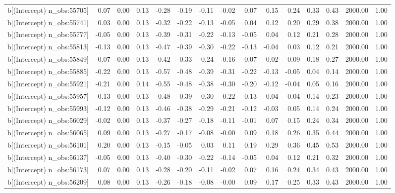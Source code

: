 \begin{table}[ht]
\begin{tabular}{rrrrrrrrrrrrrrr}
  b[(Intercept) n\_obs:55705] & 0.07 & 0.00 & 0.13 & -0.28 & -0.19 & -0.11 & -0.02 & 0.07 & 0.15 & 0.24 & 0.33 & 0.43 & 2000.00 & 1.00 \\ 
  b[(Intercept) n\_obs:55741] & 0.03 & 0.00 & 0.13 & -0.32 & -0.22 & -0.13 & -0.05 & 0.04 & 0.12 & 0.20 & 0.29 & 0.38 & 2000.00 & 1.00 \\ 
  b[(Intercept) n\_obs:55777] & -0.05 & 0.00 & 0.13 & -0.39 & -0.31 & -0.22 & -0.13 & -0.05 & 0.04 & 0.12 & 0.21 & 0.28 & 2000.00 & 1.00 \\ 
  b[(Intercept) n\_obs:55813] & -0.13 & 0.00 & 0.13 & -0.47 & -0.39 & -0.30 & -0.22 & -0.13 & -0.04 & 0.03 & 0.12 & 0.21 & 2000.00 & 1.00 \\ 
  b[(Intercept) n\_obs:55849] & -0.07 & 0.00 & 0.13 & -0.42 & -0.33 & -0.24 & -0.16 & -0.07 & 0.02 & 0.09 & 0.18 & 0.27 & 2000.00 & 1.00 \\ 
  b[(Intercept) n\_obs:55885] & -0.22 & 0.00 & 0.13 & -0.57 & -0.48 & -0.39 & -0.31 & -0.22 & -0.13 & -0.05 & 0.04 & 0.14 & 2000.00 & 1.00 \\ 
  b[(Intercept) n\_obs:55921] & -0.21 & 0.00 & 0.14 & -0.55 & -0.48 & -0.38 & -0.30 & -0.20 & -0.12 & -0.04 & 0.05 & 0.16 & 2000.00 & 1.00 \\ 
  b[(Intercept) n\_obs:55957] & -0.13 & 0.00 & 0.13 & -0.48 & -0.39 & -0.30 & -0.22 & -0.13 & -0.04 & 0.04 & 0.14 & 0.23 & 2000.00 & 1.00 \\ 
  b[(Intercept) n\_obs:55993] & -0.12 & 0.00 & 0.13 & -0.46 & -0.38 & -0.29 & -0.21 & -0.12 & -0.03 & 0.05 & 0.14 & 0.24 & 2000.00 & 1.00 \\ 
  b[(Intercept) n\_obs:56029] & -0.02 & 0.00 & 0.13 & -0.37 & -0.27 & -0.18 & -0.11 & -0.01 & 0.07 & 0.15 & 0.24 & 0.34 & 2000.00 & 1.00 \\ 
  b[(Intercept) n\_obs:56065] & 0.09 & 0.00 & 0.13 & -0.27 & -0.17 & -0.08 & -0.00 & 0.09 & 0.18 & 0.26 & 0.35 & 0.44 & 2000.00 & 1.00 \\ 
  b[(Intercept) n\_obs:56101] & 0.20 & 0.00 & 0.13 & -0.15 & -0.05 & 0.03 & 0.11 & 0.19 & 0.29 & 0.36 & 0.45 & 0.53 & 2000.00 & 1.00 \\ 
  b[(Intercept) n\_obs:56137] & -0.05 & 0.00 & 0.13 & -0.40 & -0.30 & -0.22 & -0.14 & -0.05 & 0.04 & 0.12 & 0.21 & 0.32 & 2000.00 & 1.00 \\ 
  b[(Intercept) n\_obs:56173] & 0.07 & 0.00 & 0.13 & -0.28 & -0.20 & -0.11 & -0.02 & 0.07 & 0.16 & 0.24 & 0.34 & 0.43 & 2000.00 & 1.00 \\ 
  b[(Intercept) n\_obs:56209] & 0.08 & 0.00 & 0.13 & -0.26 & -0.18 & -0.08 & -0.00 & 0.09 & 0.17 & 0.25 & 0.33 & 0.43 & 2000.00 & 1.00 \\ 

\end{tabular}
\end{table}
